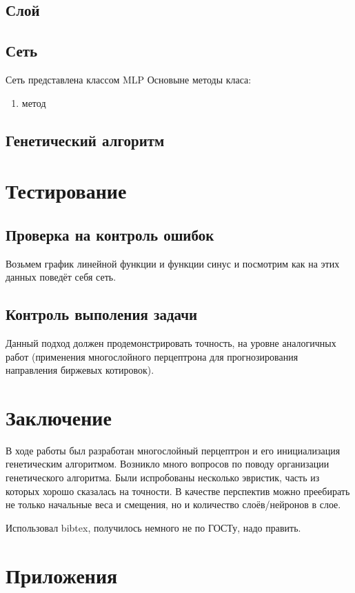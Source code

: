 \documentclass[a4paper,12pt]{article}
\begin{document}
\subsection{Слой}

\subsection{Сеть}
Сеть представлена классом MLP
Основыне методы класа:

\begin{enumerate}
\item метод
\end{enumerate}

\subsection{Генетический алгоритм}

\newpage\section{Тестирование}
\subsection{Проверка на контроль ошибок}
Возьмем график линейной функции и функции синус и посмотрим как на этих данных поведёт себя сеть.

\subsection{Контроль выполения задачи}
Данный подход должен продемонстрировать точность, на уровне аналогичных работ (применения многослойного перцептрона для прогнозирования направления биржевых котировок).

\newpage\section*{Заключение}
В ходе работы был разработан многослойный перцептрон и его инициализация генетическим алгоритмом. Возникло много вопросов по поводу организации генетического алгоритма. Были испробованы несколько эвристик, часть из которых хорошо сказалась на точности. В качестве перспектив можно преебирать не только начальные веса и смещения, но и количество слоёв/нейронов в слое.


\newpage
\renewcommand\refname{Список использованных источников}
Использовал bibtex, получилось немного не по ГОСТу, надо править.
\nocite{*}


\newpage\section*{Приложения}
\end{document}
